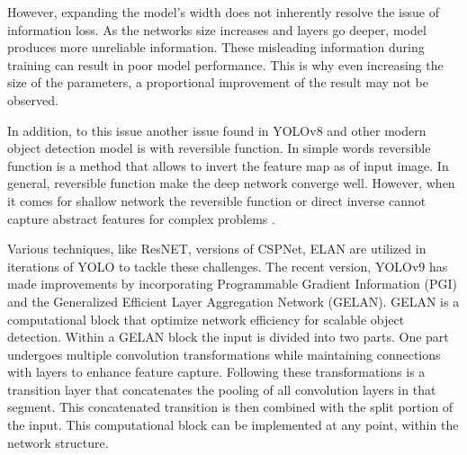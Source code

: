 However, expanding the model's width does not inherently resolve the issue of information loss. As the networks size increases and layers go deeper, model produces more unreliable information. These misleading information during training can result in poor model performance. This is why even increasing the size of the parameters, a proportional improvement of the result may not be observed.

In addition, to this issue another issue found in YOLOv8 and other modern object detection model is with reversible function. In simple words reversible function is a method that allows to invert the feature map as of  input image. In general, reversible function make the deep network converge well. However, when it comes for shallow network the reversible function or direct inverse cannot capture abstract features for complex problems \cite{wang2024yolov9}.

Various techniques, like ResNET, versions of CSPNet, ELAN are utilized in iterations of YOLO to tackle these challenges. The recent version, YOLOv9 \cite{wang2024yolov9} has made improvements by incorporating Programmable Gradient Information (PGI) and the Generalized Efficient Layer Aggregation Network (GELAN). GELAN is a computational block that optimize network efficiency for scalable object detection. Within a GELAN block the input is divided into two parts. One part undergoes multiple convolution transformations while maintaining connections with layers to enhance feature capture. Following these transformations is a transition layer that concatenates the pooling of all convolution layers in that segment. This concatenated transition is then combined with the split portion of the input. This computational block can be implemented at any point, within the network structure.

